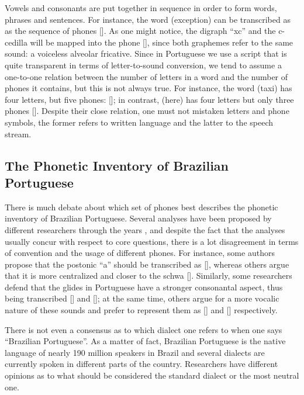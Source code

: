 Vowels and consonants are put together in sequence in order to form words, phrases and sentences. For instance, the word  (exception) can be transcribed as as the sequence of phones []. As one might notice, the digraph ``xc'' and the c-cedilla will be mapped into the phone [], since both graphemes refer to the same sound: a voiceless alveolar fricative. Since in Portuguese we use a script that is quite transparent in terms of letter-to-sound conversion, we tend to assume a one-to-one relation between the number of letters in a word and the number of phones it contains, but this is not always true. For instance, the word  (taxi) has four letters, but five phones: []; in contrast,  (here) has four letters but only three phones []. Despite their close relation, one must not mistaken letters and phone symbols, the former refers to written language and the latter to the speech stream.

\subsection{The Phonetic Inventory of Brazilian Portuguese} 

There is much debate about which set of phones best describes the phonetic inventory of Brazilian Portuguese. Several analyses have been proposed by different researchers through the years \cite{Bisol2005, Cagliari2002, Camara1970, Cristofaro2005, Neves1999}, and despite the fact that the analyses usually concur with respect to core questions, there is a lot disagreement in terms of convention and the usage of different phones.  For instance, some authors propose that the postonic ``a'' should be transcribed as [], whereas others argue that it is more centralized and closer to the schwa []. Similarly, some researchers defend that the glides in Portuguese have a stronger consonantal aspect, thus being transcribed [] and []; at the same time, others argue for a more vocalic nature of these sounds and prefer to represent them as [] and [] respectively. 

There is not even a consensus as to which dialect one refers to when one says ``Brazilian Portuguese''. As a matter of fact, Brazilian Portuguese is the native language of nearly 190 million speakers in Brazil \cite{Ethnologue2005} and several dialects are currently spoken in different parts of the country. Researchers have different opinions as to what should be considered the standard dialect or the most neutral one.

